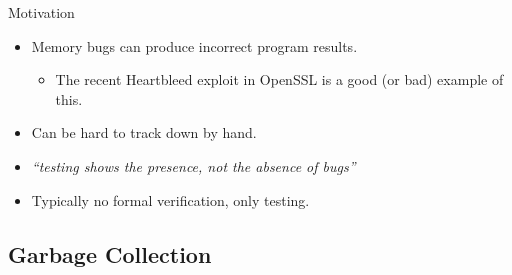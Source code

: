 \documentclass[usenames,dvipsnames]{beamer}
\begin{document}
\begin{frame}{Motivation}
  \begin{itemize}
  \item Memory bugs can produce incorrect program results.
    \begin{itemize}
    \item The recent Heartbleed exploit in OpenSSL is a good (or bad)
      example of this.
    \end{itemize}


  \item Can be hard to track down by hand.
  \item \textit{``testing shows the presence, not the absence of
      bugs''}
  \item Typically no formal verification, only testing.


  \end{itemize}
\end{frame}

\subsection{Garbage Collection}
\end{document}
